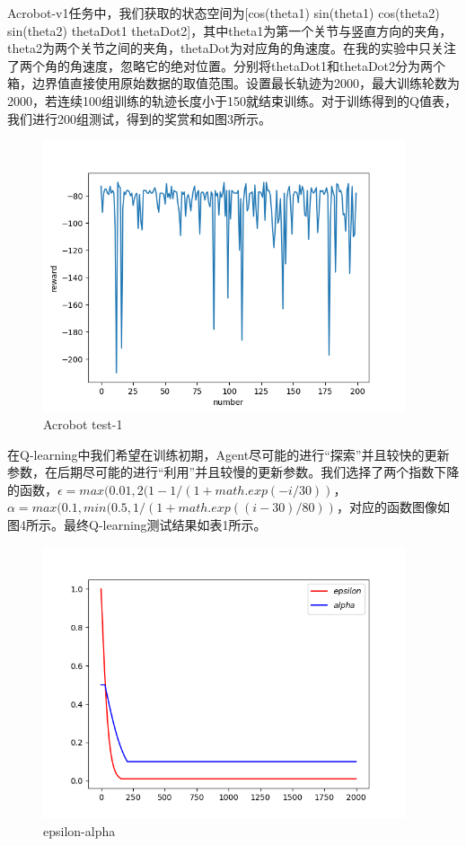 \documentclass[a4paper,UTF8]{article}
\theoremstyle{definition}
\begin{document}
	Acrobot-v1任务中，我们获取的状态空间为[cos(theta1) sin(theta1) cos(theta2) sin(theta2) thetaDot1 thetaDot2]，其中theta1为第一个关节与竖直方向的夹角，theta2为两个关节之间的夹角，thetaDot为对应角的角速度。在我的实验中只关注了两个角的角速度，忽略它的绝对位置。分别将thetaDot1和thetaDot2分为两个箱，边界值直接使用原始数据的取值范围。设置最长轨迹为2000，最大训练轮数为2000，若连续100组训练的轨迹长度小于150就结束训练。对于训练得到的Q值表，我们进行200组测试，得到的奖赏和如图3所示。
\begin{figure}[!h]
\centering
\small
\includegraphics[height=8cm]{Acrobot-v1.png}
\caption{Acrobot test-1}
\end{figure}

	在Q-learning中我们希望在训练初期，Agent尽可能的进行“探索”并且较快的更新参数，在后期尽可能的进行“利用”并且较慢的更新参数。我们选择了两个指数下降的函数，$\epsilon = max(0.01,2(1-1/(1+math.exp(-i/30))$，$\alpha=max(0.1,min(0.5,1/(1+math.exp((i-30)/80))$，对应的函数图像如图4所示。最终Q-learning测试结果如表1所示。
\begin{figure}[!h]
\centering
\small
\includegraphics[height=8cm]{epsilon-alpha.png}
\caption{epsilon-alpha}
\end{figure}
\end{document}
